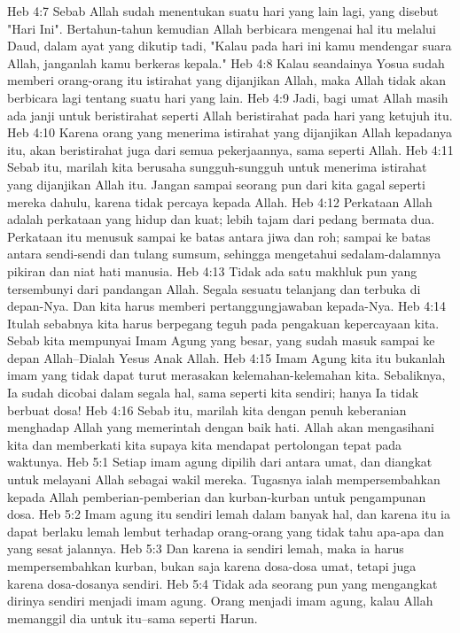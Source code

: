 Heb 4:7  Sebab Allah sudah menentukan suatu hari yang lain lagi, yang disebut "Hari Ini". Bertahun-tahun kemudian Allah berbicara mengenai hal itu melalui Daud, dalam ayat yang dikutip tadi, "Kalau pada hari ini kamu mendengar suara Allah, janganlah kamu berkeras kepala."
Heb 4:8  Kalau seandainya Yosua sudah memberi orang-orang itu istirahat yang dijanjikan Allah, maka Allah tidak akan berbicara lagi tentang suatu hari yang lain.
Heb 4:9  Jadi, bagi umat Allah masih ada janji untuk beristirahat seperti Allah beristirahat pada hari yang ketujuh itu.
Heb 4:10  Karena orang yang menerima istirahat yang dijanjikan Allah kepadanya itu, akan beristirahat juga dari semua pekerjaannya, sama seperti Allah.
Heb 4:11  Sebab itu, marilah kita berusaha sungguh-sungguh untuk menerima istirahat yang dijanjikan Allah itu. Jangan sampai seorang pun dari kita gagal seperti mereka dahulu, karena tidak percaya kepada Allah.
Heb 4:12  Perkataan Allah adalah perkataan yang hidup dan kuat; lebih tajam dari pedang bermata dua. Perkataan itu menusuk sampai ke batas antara jiwa dan roh; sampai ke batas antara sendi-sendi dan tulang sumsum, sehingga mengetahui sedalam-dalamnya pikiran dan niat hati manusia.
Heb 4:13  Tidak ada satu makhluk pun yang tersembunyi dari pandangan Allah. Segala sesuatu telanjang dan terbuka di depan-Nya. Dan kita harus memberi pertanggungjawaban kepada-Nya.
Heb 4:14  Itulah sebabnya kita harus berpegang teguh pada pengakuan kepercayaan kita. Sebab kita mempunyai Imam Agung yang besar, yang sudah masuk sampai ke depan Allah--Dialah Yesus Anak Allah.
Heb 4:15  Imam Agung kita itu bukanlah imam yang tidak dapat turut merasakan kelemahan-kelemahan kita. Sebaliknya, Ia sudah dicobai dalam segala hal, sama seperti kita sendiri; hanya Ia tidak berbuat dosa!
Heb 4:16  Sebab itu, marilah kita dengan penuh keberanian menghadap Allah yang memerintah dengan baik hati. Allah akan mengasihani kita dan memberkati kita supaya kita mendapat pertolongan tepat pada waktunya.
Heb 5:1  Setiap imam agung dipilih dari antara umat, dan diangkat untuk melayani Allah sebagai wakil mereka. Tugasnya ialah mempersembahkan kepada Allah pemberian-pemberian dan kurban-kurban untuk pengampunan dosa.
Heb 5:2  Imam agung itu sendiri lemah dalam banyak hal, dan karena itu ia dapat berlaku lemah lembut terhadap orang-orang yang tidak tahu apa-apa dan yang sesat jalannya.
Heb 5:3  Dan karena ia sendiri lemah, maka ia harus mempersembahkan kurban, bukan saja karena dosa-dosa umat, tetapi juga karena dosa-dosanya sendiri.
Heb 5:4  Tidak ada seorang pun yang mengangkat dirinya sendiri menjadi imam agung. Orang menjadi imam agung, kalau Allah memanggil dia untuk itu--sama seperti Harun.
